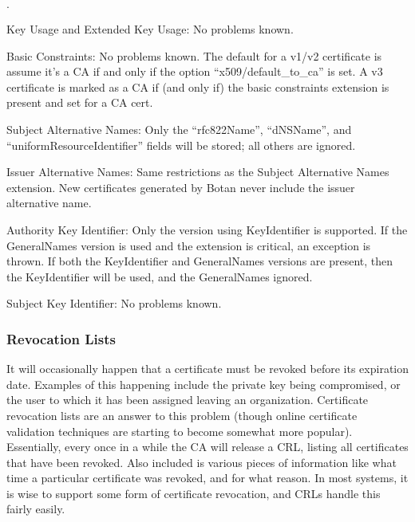 \documentclass{article}
\begin{document}
\begin{list}{$\cdot$}
  \item Key Usage and Extended Key Usage: No problems known.
  \item

  \item Basic Constraints: No problems known. The default for a v1/v2
        certificate is assume it's a CA if and only if the option
        ``x509/default\_to\_ca'' is set. A v3 certificate is marked as a CA if
        (and only if) the basic constraints extension is present and set for a
        CA cert.

  \item Subject Alternative Names: Only the ``rfc822Name'', ``dNSName'', and
        ``uniformResourceIdentifier'' fields will be stored; all others are
        ignored.

  \item Issuer Alternative Names: Same restrictions as the Subject Alternative
        Names extension. New certificates generated by Botan never include the
        issuer alternative name.

  \item Authority Key Identifier: Only the version using KeyIdentifier is
        supported. If the GeneralNames version is used and the extension is
        critical, an exception is thrown. If both the KeyIdentifier and
        GeneralNames versions are present, then the KeyIdentifier will be
        used, and the GeneralNames ignored.

  \item Subject Key Identifier: No problems known.
\end{list}

\subsubsection{Revocation Lists}

It will occasionally happen that a certificate must be revoked before its
expiration date. Examples of this happening include the private key being
compromised, or the user to which it has been assigned leaving an
organization. Certificate revocation lists are an answer to this problem
(though online certificate validation techniques are starting to become
somewhat more popular). Essentially, every once in a while the CA will release
a CRL, listing all certificates that have been revoked. Also included is
various pieces of information like what time a particular certificate was
revoked, and for what reason. In most systems, it is wise to support some form
of certificate revocation, and CRLs handle this fairly easily.
\end{document}
